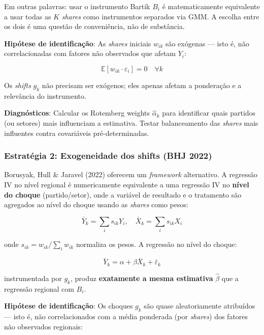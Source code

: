 \documentclass[
]{article}
\begin{document}
Em outras palavras: usar o instrumento Bartik \(B_i\) é matematicamente equivalente a usar todas as \(K\) \emph{shares} como instrumentos separados via GMM. A escolha entre os dois é uma questão de conveniência, não de substância.

\textbf{Hipótese de identificação}: As \emph{shares} iniciais \(w_{ik}\) são exógenas --- isto é, não correlacionadas com fatores não observados que afetam \(Y_i\):

\begin{equation}
\mathbb{E}[w_{ik} \cdot \varepsilon_i] = 0 \quad \forall k
\label{eq:gpss-id}
\end{equation}

Os \emph{shifts} \(g_k\) não precisam ser exógenos; eles apenas afetam a ponderação e a relevância do instrumento.

\textbf{Diagnósticos}: Calcular os Rotemberg weights \(\hat{\alpha}_k\) para identificar quais partidos (ou setores) mais influenciam a estimativa. Testar balanceamento das \emph{shares} mais influentes contra covariáveis pré-determinadas.

\subsubsection{Estratégia 2: Exogeneidade dos shifts (BHJ 2022)}\label{estratuxe9gia-2-exogeneidade-dos-shifts-bhj-2022}

Borusyak, Hull \& Jaravel (2022) oferecem um \emph{framework} alternativo. A regressão IV no nível regional é numericamente equivalente a uma regressão IV no \textbf{nível do choque} (partido/setor), onde a variável de resultado e o tratamento são agregados ao nível do choque usando as \emph{shares} como pesos:

\begin{equation}
\bar{Y}_k = \sum_i s_{ik} Y_i, \quad \bar{X}_k = \sum_i s_{ik} X_i
\label{eq:bhj-agreg}
\end{equation}

onde \(s_{ik} = w_{ik} / \sum_i w_{ik}\) normaliza os pesos. A regressão no nível do choque:

\begin{equation}
\bar{Y}_k = \alpha + \beta \bar{X}_k + \bar{\varepsilon}_k
\label{eq:bhj-reg}
\end{equation}

instrumentada por \(g_k\), produz \textbf{exatamente a mesma estimativa} \(\hat{\beta}\) que a regressão regional com \(B_i\).

\textbf{Hipótese de identificação}: Os choques \(g_k\) são quase aleatoriamente atribuídos --- isto é, não correlacionados com a média ponderada (por \emph{shares}) dos fatores não observados regionais:
\end{document}
